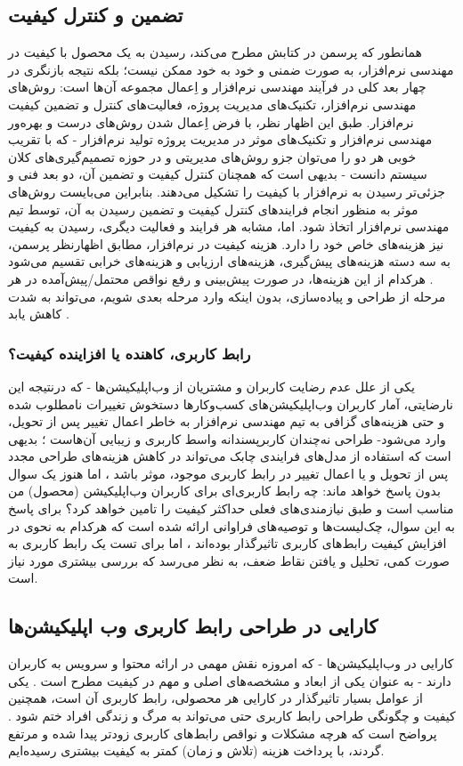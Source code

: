 \documentclass{article}
\theoremstyle{definition}
\begin{document}
	\subsection{تضمین و کنترل کیفیت}
همانطور که پرسمن در کتابش
\cite{pressman}
مطرح می‌کند، رسیدن به یک محصول با کیفیت در مهندسی نرم‌افزار، به صورت ضمنی و خود به خود ممکن نیست؛ بلکه نتیجه بازنگری در چهار بعد کلی در فرآیند مهندسی نرم‌افزار و اِعمال مجموعه آن‌ها است: روش‌های مهندسی نرم‌افزار، تکنیک‌های مدیریت پروژه، فعالیت‌های کنترل و تضمین کیفیت نرم‌افزار. طبق این اظهار نظر، با فرض اِعمال شدن روش‌های درست و بهره‌ور مهندسی نرم‌افزار و تکنیک‌های موثر در مدیریت پروژه تولید نرم‌افزار - که با تقریب خوبی هر دو را می‌توان جزو روش‌های مدیریتی و در حوزه تصمیم‌گیری‌های کلان سیستم دانست - بدیهی است که همچنان کنترل کیفیت و تضمین آن، دو بعد فنی و جزئی‌تر رسیدن به نرم‌افزار با کیفیت را تشکیل می‌دهند. بنابراین می‌بایست روش‌های موثر به منظور انجام فرایند‌های کنترل کیفیت و تضمین رسیدن به آن، توسط تیم مهندسی نرم‌افزار اتخاذ شود.
اما، مشابه هر فرایند و فعالیت دیگری، رسیدن به کیفیت نیز هزینه‌های خاص خود را دارد. هزینه کیفیت در نرم‌افزار، مطابق اظهارنظر پرسمن، به سه دسته هزینه‌های پیش‌گیری، هزینه‌های ارزیابی و هزینه‌های خرابی تقسیم می‌شود
\cite{pressman}.
هرکدام از این هزینه‌ها، در صورت پیش‌بینی و رفع نواقص محتمل/پیش‌آمده در هر مرحله از طراحی و پیاده‌سازی، بدون اینکه وارد مرحله بعدی شویم، می‌تواند به شدت کاهش یابد 
\cite{pressman}
.
\subsubsection{رابط کاربری، کاهنده یا افزاینده کیفیت؟}
یکی از علل عدم رضایت کاربران و مشتریان از وب‌اپلیکیشن‌ها - که درنتیجه این نارضایتی، آمار کاربران وب‌اپلیکیشن‌های کسب‌وکارها دستخوش تغییرات نامطلوب شده و حتی هزینه‌های گزافی به تیم مهندسی نرم‌افزار به خاطر اعمال تغییر پس از تحویل، وارد می‌شود- طراحی نه‌چندان کاربرپسندانه واسط کاربری و زیبایی آن‌هاست
\cite{assesing}
؛ بدیهی است که استفاده از مدل‌های فرایندی چابک می‌تواند در کاهش هزینه‌های طراحی مجدد پس از تحویل و یا اعمال تغییر در رابط کاربری موجود، موثر باشد 
\cite{pressman}
، اما هنوز یک سوال بدون پاسخ خواهد ماند: چه رابط کاربری‌ای برای کاربران وب‌اپلیکیشن (محصول) من مناسب است و طبق نیازمندی‌های فعلی حداکثر کیفیت را تامین خواهد کرد؟ برای پاسخ به این سوال، چک‌لیست‌ها و توصیه‌های فراوانی
\cite{pressman, sommerville}
ارائه شده است که هرکدام به نحوی در افزایش کیفیت رابط‌های کاربری تاثیرگذار بوده‌اند
\cite{measuring}
، اما برای تست یک رابط کاربری به صورت کمی، تحلیل و یافتن نقاط ضعف، به نظر می‌رسد که بررسی بیشتری مورد نیاز است.
\subsection{کارایی در طراحی رابط کاربری وب اپلیکیشن‌ها}
کارایی در وب‌اپلیکیشن‌ها - که امروزه نقش مهمی در ارائه محتوا و سرویس به کاربران دارند - به عنوان یکی از ابعاد و مشخصه‌های اصلی و مهم در کیفیت مطرح است
\cite{pressman}
. یکی از عوامل بسیار تاثیرگذار در کارایی هر محصولی، رابط کاربری آن است، همچنین کیفیت و چگونگی طراحی رابط کاربری حتی می‌تواند به مرگ و زندگی افراد ختم شود
\cite{measuring}
. پرواضح است که هرچه مشکلات و نواقص رابط‌های کاربری زودتر پیدا شده و مرتفع گردند، با پرداخت هزینه (تلاش و زمان) کمتر به کیفیت بیشتری رسیده‌ایم.
\end{document}
